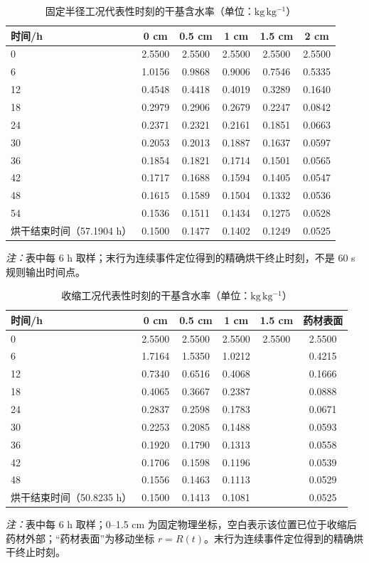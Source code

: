 \begin{table}[htbp]
\centering
\caption{固定半径工况代表性时刻的干基含水率（单位：$\mathrm{kg\,kg^{-1}}$）}
\label{tab:t5}
\begin{tabular}{lccccc}
\toprule
时间/h & 0 cm & 0.5 cm & 1 cm & 1.5 cm & 2 cm \\
\midrule
0 & 2.5500 & 2.5500 & 2.5500 & 2.5500 & 2.5500 \\
6 & 1.0156 & 0.9868 & 0.9006 & 0.7546 & 0.5335 \\
12 & 0.4548 & 0.4418 & 0.4019 & 0.3289 & 0.1640 \\
18 & 0.2979 & 0.2906 & 0.2679 & 0.2247 & 0.0842 \\
24 & 0.2371 & 0.2321 & 0.2161 & 0.1851 & 0.0663 \\
30 & 0.2053 & 0.2013 & 0.1887 & 0.1637 & 0.0597 \\
36 & 0.1854 & 0.1821 & 0.1714 & 0.1501 & 0.0565 \\
42 & 0.1717 & 0.1688 & 0.1594 & 0.1405 & 0.0547 \\
48 & 0.1615 & 0.1589 & 0.1504 & 0.1332 & 0.0536 \\
54 & 0.1536 & 0.1511 & 0.1434 & 0.1275 & 0.0528 \\
烘干结束时间（57.1904 h） & 0.1500 & 0.1477 & 0.1402 & 0.1249 & 0.0525 \\
\bottomrule
\end{tabular}
\parbox{0.88\linewidth}{\footnotesize\textit{注：}表中每 6 h 取样；末行为连续事件定位得到的精确烘干终止时刻，不是 60 s 规则输出时间点。}
\end{table}

\begin{table}[htbp]
\centering
\caption{收缩工况代表性时刻的干基含水率（单位：$\mathrm{kg\,kg^{-1}}$）}
\label{tab:t6}
\begin{tabular}{lccccc}
\toprule
时间/h & 0 cm & 0.5 cm & 1 cm & 1.5 cm & 药材表面 \\
\midrule
0 & 2.5500 & 2.5500 & 2.5500 & 2.5500 & 2.5500 \\
6 & 1.7164 & 1.5350 & 1.0212 &  & 0.4215 \\
12 & 0.7340 & 0.6516 & 0.4068 &  & 0.1666 \\
18 & 0.4065 & 0.3667 & 0.2387 &  & 0.0888 \\
24 & 0.2837 & 0.2598 & 0.1783 &  & 0.0671 \\
30 & 0.2253 & 0.2085 & 0.1488 &  & 0.0593 \\
36 & 0.1920 & 0.1790 & 0.1313 &  & 0.0558 \\
42 & 0.1706 & 0.1598 & 0.1196 &  & 0.0539 \\
48 & 0.1556 & 0.1463 & 0.1113 &  & 0.0529 \\
烘干结束时间（50.8235 h） & 0.1500 & 0.1413 & 0.1081 &  & 0.0525 \\
\bottomrule
\end{tabular}
\parbox{0.88\linewidth}{\footnotesize\textit{注：}表中每 6 h 取样；0--1.5 cm 为固定物理坐标，空白表示该位置已位于收缩后药材外部；“药材表面”为移动坐标 $r=R(t)$。末行为连续事件定位得到的精确烘干终止时刻。}
\end{table}
